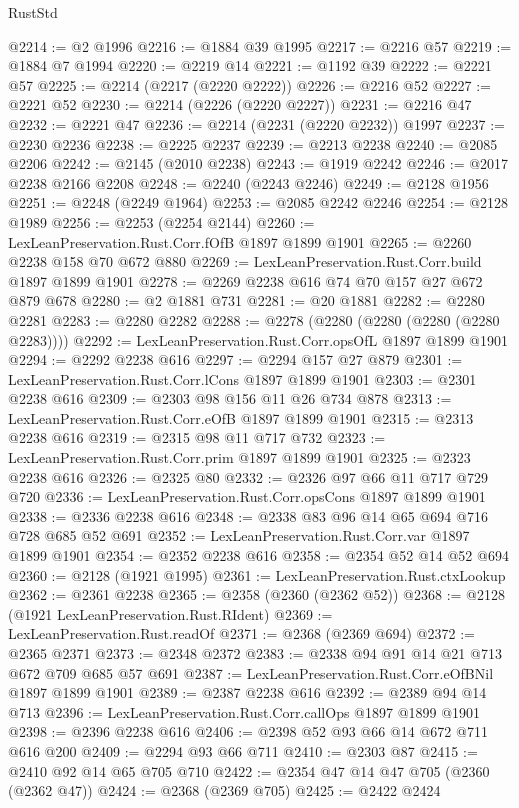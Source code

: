 \begin{lexlean}{RustStd}
\begin{coremodule}
@2214 := @2 @1996
@2216 := @1884 @39 @1995
@2217 := @2216 @57
@2219 := @1884 @7 @1994
@2220 := @2219 @14
@2221 := @1192 @39
@2222 := @2221 @57
@2225 := @2214 (@2217 (@2220 @2222))
@2226 := @2216 @52
@2227 := @2221 @52
@2230 := @2214 (@2226 (@2220 @2227))
@2231 := @2216 @47
@2232 := @2221 @47
@2236 := @2214 (@2231 (@2220 @2232)) @1997
@2237 := @2230 @2236
@2238 := @2225 @2237
@2239 := @2213 @2238
@2240 := @2085 @2206
@2242 := @2145 (@2010 @2238)
@2243 := @1919 @2242
@2246 := @2017 @2238 @2166 @2208
@2248 := @2240 (@2243 @2246)
@2249 := @2128 @1956
@2251 := @2248 (@2249 @1964)
@2253 := @2085 @2242 @2246
@2254 := @2128 @1989
@2256 := @2253 (@2254 @2144)
@2260 := LexLeanPreservation.Rust.Corr.fOfB @1897 @1899 @1901
@2265 := @2260 @2238 @158 @70 @672 @880
@2269 := LexLeanPreservation.Rust.Corr.build @1897 @1899 @1901
@2278 := @2269 @2238 @616 @74 @70 @157 @27 @672 @879 @678
@2280 := @2 @1881 @731
@2281 := @20 @1881
@2282 := @2280 @2281
@2283 := @2280 @2282
@2288 := @2278 (@2280 (@2280 (@2280 (@2280 @2283))))
@2292 := LexLeanPreservation.Rust.Corr.opsOfL @1897 @1899 @1901
@2294 := @2292 @2238 @616
@2297 := @2294 @157 @27 @879
@2301 := LexLeanPreservation.Rust.Corr.lCons @1897 @1899 @1901
@2303 := @2301 @2238 @616
@2309 := @2303 @98 @156 @11 @26 @734 @878
@2313 := LexLeanPreservation.Rust.Corr.eOfB @1897 @1899 @1901
@2315 := @2313 @2238 @616
@2319 := @2315 @98 @11 @717 @732
@2323 := LexLeanPreservation.Rust.Corr.prim @1897 @1899 @1901
@2325 := @2323 @2238 @616
@2326 := @2325 @80
@2332 := @2326 @97 @66 @11 @717 @729 @720
@2336 := LexLeanPreservation.Rust.Corr.opsCons @1897 @1899 @1901
@2338 := @2336 @2238 @616
@2348 := @2338 @83 @96 @14 @65 @694 @716 @728 @685 @52 @691
@2352 := LexLeanPreservation.Rust.Corr.var @1897 @1899 @1901
@2354 := @2352 @2238 @616
@2358 := @2354 @52 @14 @52 @694
@2360 := @2128 (@1921 @1995)
@2361 := LexLeanPreservation.Rust.ctxLookup
@2362 := @2361 @2238
@2365 := @2358 (@2360 (@2362 @52))
@2368 := @2128 (@1921 LexLeanPreservation.Rust.RIdent)
@2369 := LexLeanPreservation.Rust.readOf
@2371 := @2368 (@2369 @694)
@2372 := @2365 @2371
@2373 := @2348 @2372
@2383 := @2338 @94 @91 @14 @21 @713 @672 @709 @685 @57 @691
@2387 := LexLeanPreservation.Rust.Corr.eOfBNil @1897 @1899 @1901
@2389 := @2387 @2238 @616
@2392 := @2389 @94 @14 @713
@2396 := LexLeanPreservation.Rust.Corr.callOps @1897 @1899 @1901
@2398 := @2396 @2238 @616
@2406 := @2398 @52 @93 @66 @14 @672 @711 @616 @200
@2409 := @2294 @93 @66 @711
@2410 := @2303 @87
@2415 := @2410 @92 @14 @65 @705 @710
@2422 := @2354 @47 @14 @47 @705 (@2360 (@2362 @47))
@2424 := @2368 (@2369 @705)
@2425 := @2422 @2424

\end{coremodule}
\end{lexlean}
